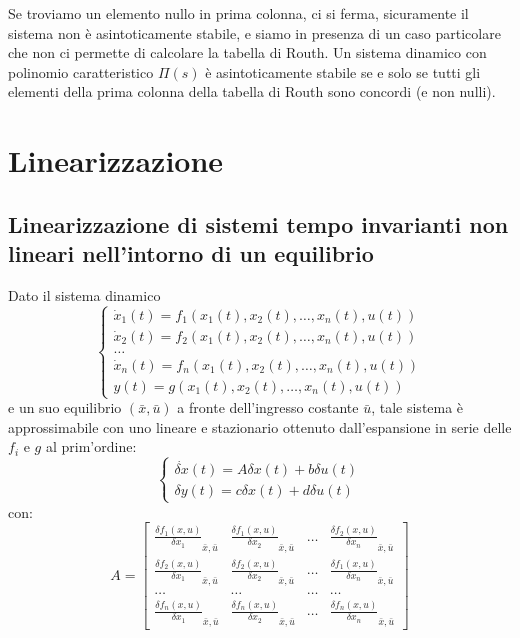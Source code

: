    Se troviamo un elemento nullo in prima colonna, ci si ferma, sicuramente il sistema non è asintoticamente stabile, e siamo in presenza di un caso particolare che non ci permette di calcolare la tabella di Routh.\newline
    \newline
    Un sistema dinamico con polinomio caratteristico $\Pi(s)$ è asintoticamente stabile se e solo se tutti gli elementi della prima colonna della tabella di Routh sono concordi (e non nulli).
    \newpage\section{Linearizzazione}
    \subsection{Linearizzazione di sistemi tempo invarianti non lineari nell'intorno di un equilibrio}
    Dato il sistema dinamico 
    \[
        \begin{cases}
            \dot{x}_1(t) = f_1(x_1(t),x_2(t),\dots,x_n(t),u(t))\\
            \dot{x}_2(t) = f_2(x_1(t),x_2(t),\dots,x_n(t),u(t))\\
            \dots\\
            \dot{x}_n(t) = f_n(x_1(t),x_2(t),\dots,x_n(t),u(t))\\
            y(t) = g(x_1(t),x_2(t),\dots,x_n(t),u(t))
        \end{cases}
    \]
    e un suo equilibrio $(\bar{x}, \bar{u})$ a fronte dell'ingresso costante $\bar{u}$, tale sistema è approssimabile con uno lineare e stazionario ottenuto dall'espansione in serie delle $f_i$ e $g$ al prim'ordine:
    \[
        \begin{cases}
            \dot{\delta x} (t) = A \delta x(t) + b \delta u(t)\\
            \delta y (t) = c \delta x (t) + d \delta u (t)
        \end{cases}
    \]
    con:
    \[
        A = \left[\begin{matrix}
            \frac{\delta f_1 (x,u)}{\delta x_1}_{\bar{x}, \bar{u}} & \frac{\delta f_1 (x,u)}{\delta x_2}_{\bar{x}, \bar{u}} & \dots & \frac{\delta f_2 (x,u)}{\delta x_n}_{\bar{x}, \bar{u}}\\
            \frac{\delta f_2(x,u)}{\delta x_1}_{\bar{x}, \bar{u}} & \frac{\delta f_2(x,u)}{\delta x_2}_{\bar{x}, \bar{u}} & \dots & \frac{\delta f_1(x,u)}{\delta x_n}_{\bar{x}, \bar{u}}\\
            \dots & \dots & \dots & \dots\\
            \frac{\delta f_n(x,u)}{\delta x_1}_{\bar{x}, \bar{u}} & \frac{\delta f_n (x,u)}{\delta x_2}_{\bar{x}, \bar{u}} & \dots & \frac{\delta f_n (x,u)}{\delta x_n}_{\bar{x}, \bar{u}} 
        \end{matrix}\right]
    \]
